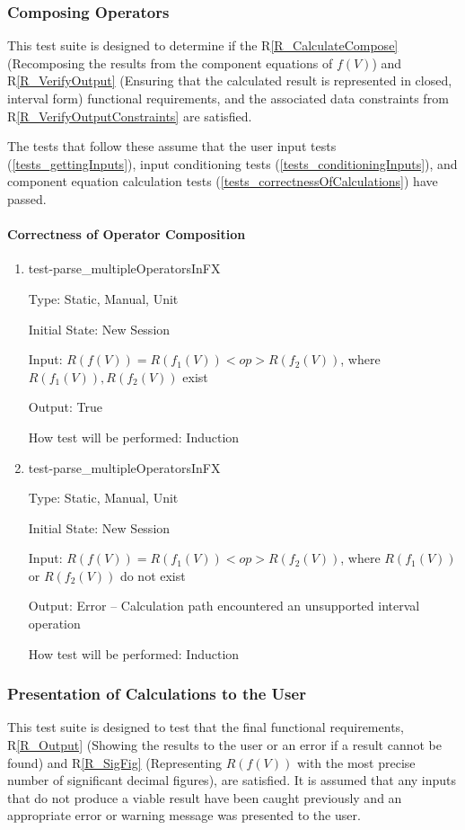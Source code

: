 \documentclass[12pt, titlepage]{article}
\newcommand{\rref}[1]{R\ref{#1}}
\begin{document}
\subsubsection{Composing Operators}
\label{tests_operatorComposition}
This test suite is designed to determine if the \rref{R_CalculateCompose} 
(Recomposing the results from the component equations of $f(V)$) and 
\rref{R_VerifyOutput} (Ensuring that the calculated result is represented in 
closed, interval form) functional requirements, and the associated data 
constraints from \rref{R_VerifyOutputConstraints} are satisfied.

The tests that follow these assume that the user input tests 
(\ref{tests_gettingInputs}), input conditioning tests 
(\ref{tests_conditioningInputs}), and component equation calculation tests 
(\ref{tests_correctnessOfCalculations}) have passed.

\paragraph{Correctness of Operator Composition}

\begin{enumerate}
	
	\item{test-parse\_multipleOperatorsInFX}
	
	Type: Static, Manual, Unit
	
	Initial State: New Session
	
	Input: $R(f(V)) = R(f_1(V)) <op> R(f_2(V))$, where $R(f_1(V)), R(f_2(V))$ 
	exist
	
	Output: True
	
	How test will be performed: Induction\\
	
	\item{test-parse\_multipleOperatorsInFX}
	
	Type: Static, Manual, Unit
	
	Initial State: New Session
	
	Input: $R(f(V)) = R(f_1(V)) <op> R(f_2(V))$, where $R(f_1(V))$ or 
	$R(f_2(V))$ do not exist
	
	Output: Error -- Calculation path encountered an unsupported interval 
	operation
	
	How test will be performed: Induction\\
	
\end{enumerate}

\subsubsection{Presentation of Calculations to the User}
\label{tests_outputResults}
This test suite is designed to test that the final functional requirements, 
\rref{R_Output} (Showing the results to the user or an error if a result cannot 
be found) and \rref{R_SigFig} (Representing $R(f(V))$ with the most precise 
number of significant decimal figures), are satisfied. It is assumed that any 
inputs that do not produce a viable result have been caught previously and an 
appropriate error or warning message was presented to the user.
\end{document}

